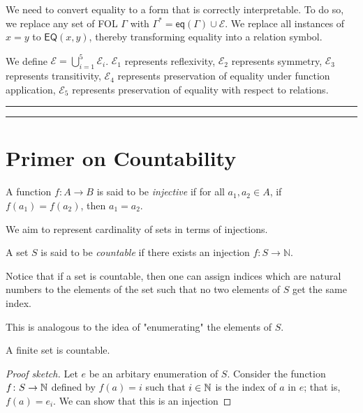 \documentclass[11pt,usenames, dvipsnames]{article}
\begin{document}
We need to convert equality to a form that is correctly interpretable. To do so, we replace any set of FOL $\Gamma$ with $\Gamma^* = \mathsf{eq}(\Gamma) \cup \mathcal{E}$. We replace all instances of $x = y$ to $\mathsf{EQ}(x, y)$, thereby transforming equality into a relation symbol.

We define $\mathcal{E} = \bigcup\limits_{i = 1}^5 \mathcal{E}_i$. $\mathcal{E}_1$ represents reflexivity, $\mathcal{E}_2$ represents symmetry, $\mathcal{E}_3$ represents transitivity, $\mathcal{E}_4$ represents preservation of equality under function application, $\mathcal{E}_5$ represents preservation of equality with respect to relations.

\vspace{5truemm}
\hrule
\hrule

\section{\large \centering Primer on Countability}
\noindent

\begin{definition}[Injection]
  A function $f \colon A \to B$ is said to be \emph{injective} if for all $a_1, a_2 \in A$, if $f(a_1) = f(a_2)$, then $a_1 = a_2$.
\end{definition}

We aim to represent cardinality of sets in terms of injections.

\begin{definition}
  A set $S$ is said to be \emph{countable} if there exists an injection $f \colon S \to \mathbb{N}$.
\end{definition}

Notice that if a set is countable, then one can assign indices which are natural numbers to the elements of the set such that no two elements of $S$ get the same index.

This is analogous to the idea of "enumerating" the elements of $S$.

\begin{claim}
  A finite set is countable.
\end{claim}

\begin{proof}[Proof sketch]
  Let $e$ be an arbitary enumeration of $S$. Consider the function $f \colon S \to \mathbb{N}$ defined by $f(a) = i$ such that $i \in \mathbb{N}$ is the index of $a$ in $e$; that is, $f(a) = e_i$. We can show that this is an injection
\end{proof}
\end{document}
